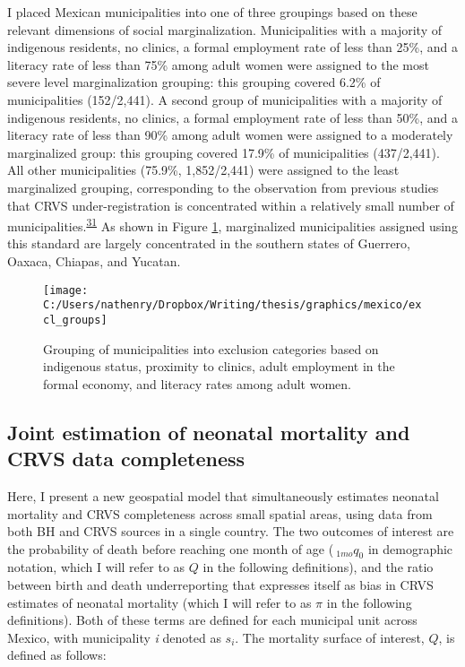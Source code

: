 \documentclass[
]{article}
\begin{document}
I placed Mexican municipalities into one of three groupings based on these relevant dimensions of social marginalization. Municipalities with a majority of indigenous residents, no clinics, a formal employment rate of less than 25\%, and a literacy rate of less than 75\% among adult women were assigned to the most severe level marginalization grouping: this grouping covered 6.2\% of municipalities (152/2,441). A second group of municipalities with a majority of indigenous residents, no clinics, a formal employment rate of less than 50\%, and a literacy rate of less than 90\% among adult women were assigned to a moderately marginalized group: this grouping covered 17.9\% of municipalities (437/2,441). All other municipalities (75.9\%, 1,852/2,441) were assigned to the least marginalized grouping, corresponding to the observation from previous studies that CRVS under-registration is concentrated within a relatively small number of municipalities.\textsuperscript{\protect\hyperlink{ref-Hernandez2012}{31}} As shown in Figure \ref{fig:excl-groups}, marginalized municipalities assigned using this standard are largely concentrated in the southern states of Guerrero, Oaxaca, Chiapas, and Yucatan.

\begin{figure}[!ht]

{\centering \texttt{[image: C:/Users/nathenry/Dropbox/Writing/thesis/graphics/mexico/excl\_groups]} 

}

\caption{Grouping of municipalities into exclusion categories based on indigenous status, proximity to clinics, adult employment in the formal economy, and literacy rates among adult women.}\label{fig:excl-groups}
\end{figure}

\hypertarget{joint-estimation-of-neonatal-mortality-and-crvs-data-completeness}{%
\subsection{Joint estimation of neonatal mortality and CRVS data completeness}\label{joint-estimation-of-neonatal-mortality-and-crvs-data-completeness}}

Here, I present a new geospatial model that simultaneously estimates neonatal mortality and CRVS completeness across small spatial areas, using data from both BH and CRVS sources in a single country. The two outcomes of interest are the probability of death before reaching one month of age (\(~_{1mo}q_0\) in demographic notation, which I will refer to as \(Q\) in the following definitions), and the ratio between birth and death underreporting that expresses itself as bias in CRVS estimates of neonatal mortality (which I will refer to as \(\pi\) in the following definitions). Both of these terms are defined for each municipal unit across Mexico, with municipality \emph{i} denoted as \(s_i\). The mortality surface of interest, \(Q\), is defined as follows:
\end{document}
